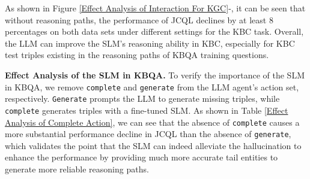 \documentclass[11pt]{article}
\begin{document}
As shown in Figure \ref{Effect Analysis of Interaction For KGC}-, it can be seen that without reasoning paths, the performance of JCQL declines by at least $8$ percentages on both data sets under different settings for the KBC task. Overall, the LLM can improve the SLM’s reasoning ability in KBC, especially for KBC test triples existing in the reasoning paths of KBQA training questions.




\noindent\textbf{Effect Analysis of the SLM in KBQA.} To verify the importance of the SLM in KBQA, we remove \texttt{complete} and \texttt{generate} from the LLM agent's action set, respectively. \texttt{Generate} prompts the LLM to generate missing triples, while \texttt{complete} generates triples with a fine-tuned SLM.
As shown in Table \ref{Effect Analysis of Complete Action}, we can see that the absence of \texttt{complete} causes a more substantial performance decline in JCQL than the absence of \texttt{generate}, which validates the point that the SLM can indeed alleviate the hallucination to enhance the performance by providing much more accurate tail entities to generate more reliable reasoning paths. 


\end{document}
